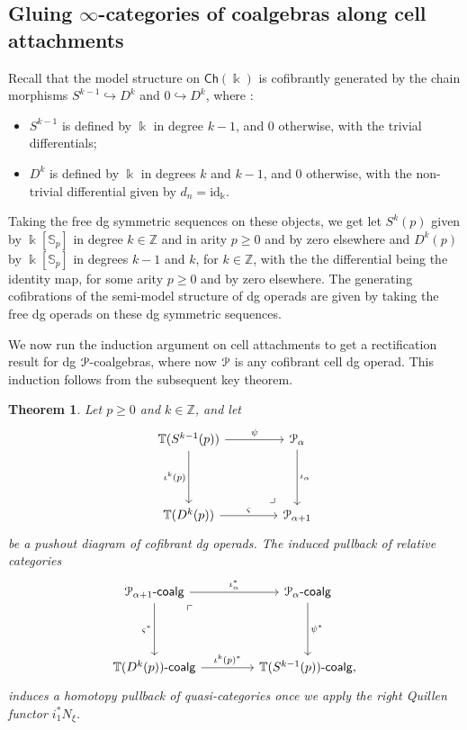 \documentclass{proc-l}
\renewcommand{\mathcal}{\EuScript}
\newcommand{\oneop}{\mathcal{P}}
\newcommand{\onecoalg}[1]{#1\text{-}\mathsf{coalg}}
\theoremstyle{plain}
\newtheorem{theorem}{Theorem}[section]
\theoremstyle{definition}
\theoremstyle{remark}
\newcommand{\kk}{\Bbbk}
\begin{document}
\subsection{Gluing $\infty$-categories of coalgebras along cell attachments}%
\label{Section:4.3}
Recall that the model structure on $\mathsf{Ch}(\kk)$ is cofibrantly generated by the chain morphisms $S^{k-1}\hookrightarrow D^k$ and $0\hookrightarrow D^k$, where :
\begin{itemize}
\item $S^{k-1}$ is defined by $\kk$ in degree $k-1$, and $0$ otherwise, with the trivial differentials;
\item $D^k$ is defined by $\kk$ in degrees $k$ and $k-1$, and $0$ otherwise, with the non-trivial differential given by $d_n= \mathrm{id}_\kk$.
\end{itemize}

Taking the free dg symmetric sequences on these objects, we get let $S^{k}(p)$ given by $\kk[\mathbb{S}_p]$ in degree $k \in \mathbb{Z}$ and in arity $p \geq 0$ and by zero elsewhere and $D^k(p)$ by $\kk[\mathbb{S}_p]$ in degrees $k-1$ and $k$, for $k \in \mathbb{Z}$, with the the differential being the identity map, for some arity $p \geq 0$ and by zero elsewhere. The generating cofibrations of the semi-model structure of dg operads are given by taking the free dg operads on these dg symmetric sequences.

We now run the induction argument on cell attachments to get a rectification result for dg $\mathcal{P}$-coalgebras, where now $\mathcal{P}$ is any cofibrant cell dg operad. This induction follows from the subsequent key theorem.

\begin{theorem}%
\label{Theorem:4.11}\label{thm: key theorem}
Let $p \geq 0$ and $k \in \mathbb{Z}$, and let
\[
\begin{tikzcd}[column sep=3.5pc,row sep=3.5pc]
\mathbb{T}(S^{k-1}(p)) \arrow[r,"\psi"] \arrow[d,"\iota^k(p)",swap]  \arrow[dr, phantom,"\ulcorner" rotate=-180, very near end]
&\oneop_\alpha \arrow[d,"\iota_\alpha"]  \\
\mathbb{T}(D^k(p)) \arrow[r,"\varsigma"]
&\oneop_{\alpha + 1}
\end{tikzcd}
\]
be a pushout diagram of cofibrant dg operads. The induced pullback of \emph{relative} categories
\[
\begin{tikzcd}[column sep=3.5pc,row sep=3.5pc]
\onecoalg{\oneop_{\alpha + 1}} \arrow[r,"\iota_\alpha^*"] \arrow[d,"\varsigma^*",swap] \arrow[dr, phantom, "\ulcorner", very near start]
&\onecoalg{\oneop_\alpha}\arrow[d,"\psi^*"]  \\
\onecoalg{\mathbb{T}(D^k(p))} \arrow[r,"\iota^k(p)^*"]
&\onecoalg{\mathbb{T}(S^{k-1}(p))},
\end{tikzcd}
\]
induces a \emph{homotopy pullback} of quasi-categories once we apply the right Quillen functor $i_1^*N_{\xi}$.
\end{theorem}
\end{document}
